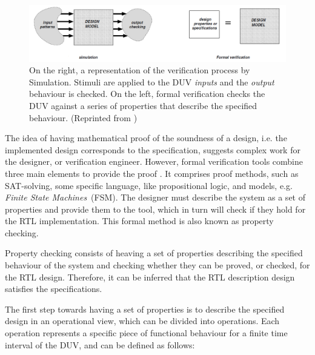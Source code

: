 \begin{figure}[htb!]
	\centering
	\includegraphics[width=\textwidth]{images/sim_vs_formal.PNG}
	\caption{On the right, a representation of the verification process by Simulation. Stimuli are applied to the DUV \textit{inputs} and the \textit{output} behaviour is checked. On the left, formal verification checks the DUV against a series of properties that describe the specified behaviour. (Reprinted from \cite{thesis-formal})}
	\label{fig:sim-vs-formal}
\end{figure}

The idea of having mathematical proof of the soundness  of a design, i.e. the implemented design corresponds to the specification, suggests complex work for the designer, or verification engineer. However, formal verification tools combine three main elements to provide the proof . It comprises proof methods, such as SAT-solving, some specific language, like propositional logic, and models, e.g. \textit{Finite State Machines}~(FSM). The designer  must describe the system as a set of properties and provide them to the tool, which in turn will check if they hold for the RTL implementation. This formal method is also known as property checking. 

Property checking consists of heaving  a set of properties describing the specified behaviour of the system and checking whether they can be proved, or checked, for the RTL design.  Therefore, it can be inferred that the RTL description design satisfies the specifications.  

The first step towards having a set of properties is to describe the specified design in an operational view, which can be divided into operations. Each operation represents a specific piece of functional behaviour for a finite time interval of the DUV, and can be defined as follows:

